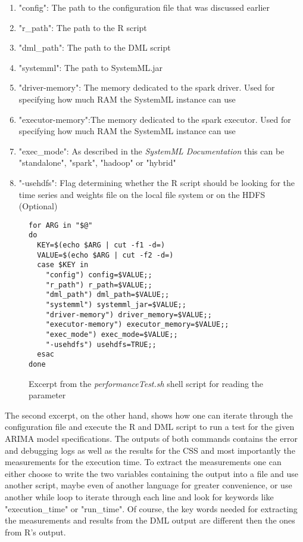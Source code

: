 \begin{enumerate}
    \item "config": The path to the configuration file that was discussed earlier
    \item "r\_path": The path to the R script
    \item "dml\_path": The path to the \acs{DML} script
    \item "systemml": The path to SystemML.jar
    \item "driver-memory": The memory dedicated to the spark driver. Used for specifying how much RAM the SystemML instance can use
    \item "executor-memory":The memory dedicated to the spark executor. Used for specifying how much RAM the SystemML instance can use
    \item "exec\_mode": As described in the \textit{SystemML Documentation}\cite{SystemMLDocumentation} this can be "standalone", "spark", "hadoop" or "hybrid"
    \item "-usehdfs": Flag determining whether the R script should be looking for the time series and weights file on the local file system or on the \acs{HDFS} (Optional)
\end{enumerate}



\begin{figure}[!ht]
\centering
\begin{verbatim}
for ARG in "$@"
do
  KEY=$(echo $ARG | cut -f1 -d=)
  VALUE=$(echo $ARG | cut -f2 -d=)
  case $KEY in
    "config") config=$VALUE;;
    "r_path") r_path=$VALUE;;
    "dml_path") dml_path=$VALUE;;
    "systemml") systemml_jar=$VALUE;;
    "driver-memory") driver_memory=$VALUE;;
    "executor-memory") executor_memory=$VALUE;;
    "exec_mode") exec_mode=$VALUE;;
    "-usehdfs") usehdfs=TRUE;;
  esac
done
\end{verbatim}
\vspace*{-0.3cm}
\caption{Excerpt from the \textit{performanceTest.sh} shell script for reading the parameter}
\label{fig:performanceTest.sh_1}
\end{figure}

The second excerpt, on the other hand, shows how one can iterate through the configuration file and execute the R and \acs{DML} script to run a test for the given \acs{ARIMA} model specifications. The outputs of both commands contains the error and debugging logs as well as the results for the \acl{CSS} and most importantly the measurements for the execution time. To extract the measurements one can either choose to write the two variables containing the output into a file and use another script, maybe even of another language for greater convenience, or use another while loop to iterate through each line and look for keywords like "execution\_time" or "run\_time". Of course, the key words needed for extracting the measurements and results from the \acs{DML} output are different then the ones from R's output.

